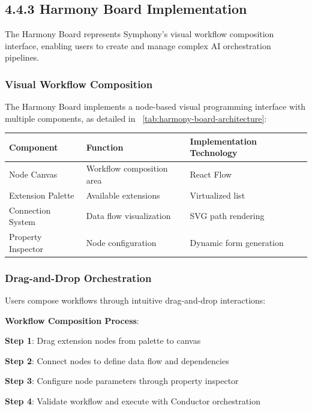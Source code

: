 \subsection*{4.4.3 Harmony Board Implementation}
\label{subsec:harmony-board-implementation}

The Harmony Board represents Symphony's visual workflow composition interface, enabling users to create and manage complex AI orchestration pipelines.

\subsubsection*{Visual Workflow Composition}

The Harmony Board implements a node-based visual programming interface with multiple components, as detailed in ~\ref{tab:harmony-board-architecture}:

\begin{center}
\begin{tabular}{@{}lll@{}}
\toprule
\textbf{Component} & \textbf{Function} & \textbf{Implementation Technology} \\
\midrule
Node Canvas & Workflow composition area & React Flow \\
Extension Palette & Available extensions & Virtualized list \\
Connection System & Data flow visualization & SVG path rendering \\
Property Inspector & Node configuration & Dynamic form generation \\
\bottomrule
\end{tabular}
\label{tab:harmony-board-architecture}
\end{center}

\subsubsection*{Drag-and-Drop Orchestration}

Users compose workflows through intuitive drag-and-drop interactions:

\begin{successbox}
\textbf{Workflow Composition Process}:
\begin{compactlist}
    \item \textbf{Step 1}: Drag extension nodes from palette to canvas
    \item \textbf{Step 2}: Connect nodes to define data flow and dependencies
    \item \textbf{Step 3}: Configure node parameters through property inspector
    \item \textbf{Step 4}: Validate workflow and execute with Conductor orchestration
\end{compactlist}
\end{successbox}

